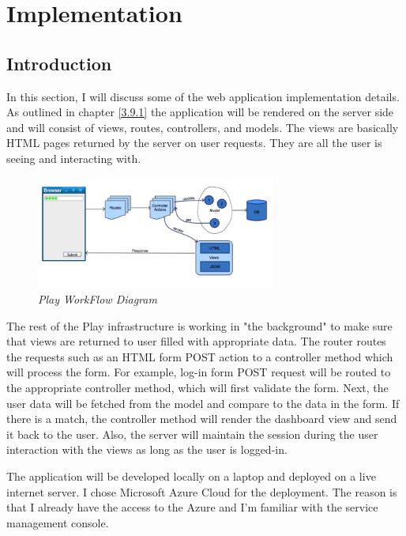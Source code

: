 \documentclass[12pt,twoside,a4paper]{report}
\begin{document}
\chapter{Implementation}\label{4}

\section{Introduction}\label{4.1}
In this section, I will discuss some of the web application implementation details. As outlined in chapter \ref{3.9.1} the application will be rendered on the server side and will consist of views, routes, controllers, and models. The views are basically HTML pages returned by the server on user requests. They are all the user is seeing and interacting with.

\begin{figure}[!ht]
	\centering
		\includegraphics[width=0.7\textwidth, totalheight=5.8cm]
		{play_workflow_diagram}
	\caption{\textit{Play WorkFlow Diagram}}
	\label{f4.1}
\end{figure}

The rest of the Play infrastructure is working in "the background" to make sure that views are returned to user filled with appropriate data. The router routes the requests such as an HTML form POST action to a controller method which will process the form. For example, log-in form POST request will be routed to the appropriate controller method, which will first validate the form. Next, the user data will be fetched from the model and compare to the data in the form. If there is a match, the controller method will render the dashboard view and send it back to the user. Also, the server will maintain the session during the user interaction with the views as long as the user is logged-in.

The application will be developed locally on a laptop and deployed on a live internet server. I chose Microsoft Azure Cloud for the deployment.  The reason is that I already have the access to the Azure and I'm familiar with the service management console.
\end{document}
